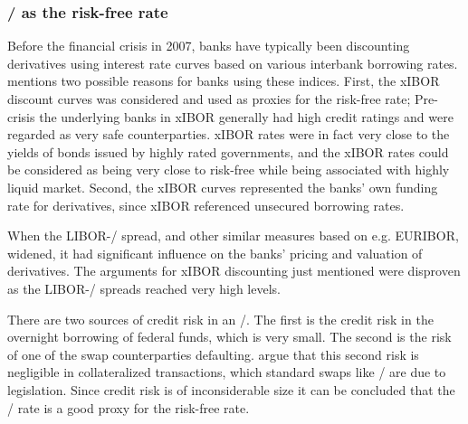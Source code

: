\documentclass[main.tex]{subfiles}
\begin{document}
    \subsubsection{\OIS/ as the risk-free rate}
    
    Before the financial crisis in 2007, banks have typically been discounting
    derivatives using interest rate curves based on various interbank borrowing rates.
    \textcite[Section 8.6]{Green2015XVA} 
    mentions two possible reasons for banks using these indices.
    First, the xIBOR discount curves was considered and used as proxies for the risk-free rate;
    Pre-crisis the underlying banks in xIBOR generally had high credit ratings
    and were regarded as very safe counterparties.
    xIBOR rates were in fact very close to the yields of bonds issued by highly rated governments,
    and the xIBOR rates could be considered as being very close to risk-free 
    while being associated with highly liquid market.
    Second, the xIBOR curves represented the banks' own funding rate for derivatives, since
    xIBOR referenced unsecured borrowing rates.

    When the LIBOR-\OIS/ spread, and other similar measures based on e.g. EURIBOR, widened, 
    it had significant influence on the banks' pricing and valuation of derivatives.
    The arguments for xIBOR discounting just mentioned
    were disproven as the LIBOR-\OIS/ spreads reached very high levels.

    There are two sources of credit risk in an \OIS/.
    The first is the credit risk in the overnight borrowing of federal funds, which is very small. 
    The second is the risk of one of the swap counterparties defaulting.
    \textcite{HullWhiteOISvsLIBOR}
    argue that this second risk is negligible in collateralized transactions,
    which standard swaps like \OIS/ are due to legislation.
    Since credit risk is of inconsiderable size it can be concluded 
    that the \OIS/ rate is a good proxy for the risk-free rate.
\end{document}
